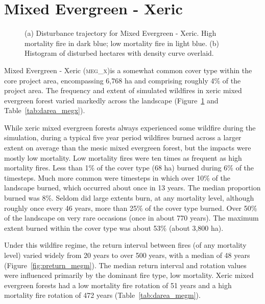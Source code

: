\section{Mixed Evergreen - Xeric} 

\begin{figure}[!htbp]
  \centering
  \caption{\small (a) Disturbance trajectory for Mixed Evergreen - Xeric. High mortality fire in dark blue; low mortality fire in light blue. (b) Histogram of disturbed hectares with density curve overlaid.} 
  \label{fig:darea_megx}
\end{figure}


Mixed Evergreen - Xeric (\textsc{meg\_x})is a somewhat common cover type within the core project area, encompassing 6,768 ha and comprising roughly 4\% of the project area. The frequency and extent of simulated wildfires in xeric mixed evergreen forest varied markedly across the landscape (Figure~\ref{fig:darea_megx} and Table~\ref{tab:darea_megx}). 

While xeric mixed evergreen forests always experienced some wildfire during the simulation, during a typical five year period wildfires burned across a larger extent on average than the mesic mixed evergreen forest, but the impacts were mostly low mortality. Low mortality fires were ten times as frequent as high mortality fires. Less than 1\% of the cover type (68 ha) burned during 6\% of the timesteps. Much more common were timesteps in which over 10\% of the landscape burned, which occurred about once in 13 years. The median proportion burned was 8\%. Seldom did large extents burn, at any mortality level, although roughly once every 46 years, more than 25\% of the cover type burned. Over 50\% of the landscape on very rare occasions (once in about 770 years). The maximum extent burned within the cover type was about 53\% (about 3,800 ha).

Under this wildfire regime, the return interval between fires (of any mortality level) varied widely from 20 years to over 500 years, with a median of 48 years (Figure~\ref{fig:preturn_megm}). The median return interval and rotation values were influenced primarily by the dominant fire type, low mortality. Xeric mixed evergreen forests had a low mortality fire rotation of 51 years and a high mortality fire rotation of 472 years (Table~\ref{tab:darea_megm}). 

